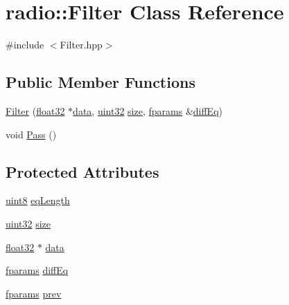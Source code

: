 \hypertarget{classradio_1_1Filter}{\section{radio\+:\+:Filter Class Reference}
\label{classradio_1_1Filter}
}


{\ttfamily \#include $<$Filter.\+hpp$>$}

\subsection*{Public Member Functions}
\begin{DoxyCompactItemize}
\item 
\hyperlink{classradio_1_1Filter_a48ab268192e0135e5c9f74ad35a90fa1}{Filter} (\hyperlink{definitions_8hpp_aacdc525d6f7bddb3ae95d5c311bd06a1}{float32} $\ast$\hyperlink{classradio_1_1Filter_a25459a2b762120df0102f00553344be2}{data}, \hyperlink{definitions_8hpp_a1134b580f8da4de94ca6b1de4d37975e}{uint32} \hyperlink{classradio_1_1Filter_a7285b4c7263d8278e38abb14b5dca5d9}{size}, \hyperlink{definitions_8hpp_af19387f95516e2132a08cf60503f22a5}{fparams} \&\hyperlink{classradio_1_1Filter_abe705768a267844edfa2aaabfdac9f56}{diff\+Eq})
\item 
void \hyperlink{classradio_1_1Filter_ad2793821801780809af385463bf8f197}{Pass} ()
\end{DoxyCompactItemize}
\subsection*{Protected Attributes}
\begin{DoxyCompactItemize}
\item 
\hyperlink{definitions_8hpp_adde6aaee8457bee49c2a92621fe22b79}{uint8} \hyperlink{classradio_1_1Filter_a26a32320c4dffa8925ab5f0f06689e8d}{eq\+Length}
\item 
\hyperlink{definitions_8hpp_a1134b580f8da4de94ca6b1de4d37975e}{uint32} \hyperlink{classradio_1_1Filter_a7285b4c7263d8278e38abb14b5dca5d9}{size}
\item 
\hyperlink{definitions_8hpp_aacdc525d6f7bddb3ae95d5c311bd06a1}{float32} $\ast$ \hyperlink{classradio_1_1Filter_a25459a2b762120df0102f00553344be2}{data}
\item 
\hyperlink{definitions_8hpp_af19387f95516e2132a08cf60503f22a5}{fparams} \hyperlink{classradio_1_1Filter_abe705768a267844edfa2aaabfdac9f56}{diff\+Eq}
\item 
\hyperlink{definitions_8hpp_af19387f95516e2132a08cf60503f22a5}{fparams} \hyperlink{classradio_1_1Filter_ae7e324e76354063772bcb5f241a2eae9}{prev}
\end{DoxyCompactItemize}


